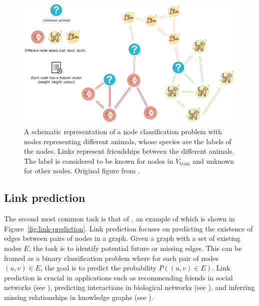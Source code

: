 \begin{figure}
	\includegraphics[width=\linewidth]{images/graph-tasks/node-classification.png}
	\caption{A schematic representation of a node classification problem with nodes representing different animals, whose species are the labels of the nodes. Links represent friendships between the different animals. The label is considered to be known for nodes in \( V_\mathrm{train} \) and unknown for other nodes. Original figure from \cite{kubara_machine_2020}.}
	\label{fig:node-classification}
\end{figure}

\subsection{Link prediction}

The second most common task is that of , an example of which is shown in Figure~\ref{fig:link-prediction}. Link prediction focuses on predicting the existence of edges between pairs of nodes in a graph. Given a graph with a set of existing nodes \( E \), the task is to identify potential future or missing edges. This can be framed as a binary classification problem where for each pair of nodes \( (u, v) \in E \), the goal is to predict the probability \( P((u, v) \in E) \). Link prediction is crucial in applications such as recommending friends in social networks (see \cite{wang_link_2015}), predicting interactions in biological networks (see \cite{zhang_graph_2021}), and inferring missing relationships in knowledge graphs (see \cite{bordes_translating_2013}).

